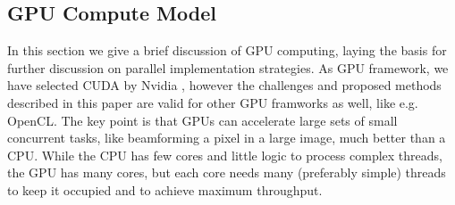 \documentclass[journal]{IEEEtran}
\begin{document}



\subsection{GPU Compute Model}



In this section we give a brief discussion of GPU computing, laying the basis for further discussion on parallel implementation strategies. As GPU framework, we have selected CUDA by Nvidia \cite{Nvidia2013}, however the challenges and proposed methods described in this paper are valid for other GPU framworks as well, like e.g. OpenCL. The key point is that GPUs can accelerate large sets of small concurrent tasks, like beamforming a pixel in a large image, much better than a CPU. While the CPU has few cores and little logic to process complex threads, the GPU has many cores, but each core needs many (preferably simple) threads to keep it occupied and to achieve maximum throughput.
\end{document}
